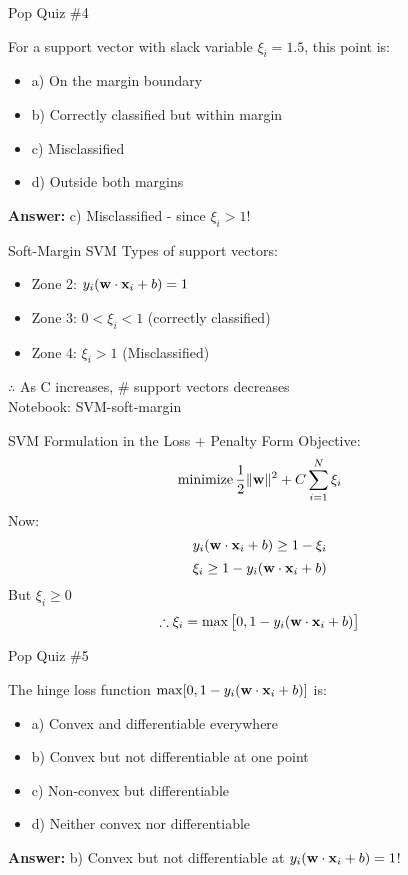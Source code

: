 \documentclass{beamer}
\begin{document}
	\begin{frame}{Pop Quiz \#4}
	\begin{tcolorbox}[colback=blue!5!white,colframe=blue!75!black,title=Quick Question!]
	For a support vector with slack variable $\xi_i = 1.5$, this point is:
	\begin{itemize}
		\item a) On the margin boundary
		\item b) Correctly classified but within margin
		\item c) Misclassified
		\item d) Outside both margins
	\end{itemize}
	\pause
	\textbf{Answer:} c) Misclassified - since $\xi_i > 1$!
	\end{tcolorbox}
	\end{frame}

	\begin{frame}{Soft-Margin SVM}
		Types of support vectors:
		\begin{itemize}
			\item Zone 2: $y_{i}(\mathbf{w} \cdot \mathbf{x}_{i} + b) = 1$
			\item Zone 3: $0 < \xi_{i} < 1$ (correctly classified)
			\item Zone 4: $\xi_{i} > 1$ (Misclassified)
		\end{itemize}
		$\therefore$ As C increases, \# support vectors decreases \\
		\vspace{1cm}
		Notebook: SVM-soft-margin
	\end{frame}
	\begin{frame}{SVM Formulation in the Loss + Penalty Form}
		Objective:
		$$\operatorname{minimize} \frac{1}{2}\|\mathbf{w}\|^{2} + C\sum_{i=1}^{N}\xi_{i}$$
		Now:
		$$y_{i}(\mathbf{w} \cdot \mathbf{x}_{i} + b) \geq 1 - \xi_{i}$$
		$$\xi_{i} \geq 1 - y_{i}(\mathbf{w} \cdot \mathbf{x}_{i} + b)$$
		But $\xi_{i} \geq 0$ \\
		$$\therefore \xi_{i} = \max \big[0, 1 - y_{i}(\mathbf{w} \cdot \mathbf{x}_{i} + b)\big]$$
	\end{frame}
	\begin{frame}{Pop Quiz \#5}
	\begin{tcolorbox}[colback=blue!5!white,colframe=blue!75!black,title=Quick Question!]
	The hinge loss function $\max[0, 1-y_i(\mathbf{w} \cdot \mathbf{x}_i + b)]$ is:
	\begin{itemize}
		\item a) Convex and differentiable everywhere
		\item b) Convex but not differentiable at one point
		\item c) Non-convex but differentiable
		\item d) Neither convex nor differentiable
	\end{itemize}
	\pause
	\textbf{Answer:} b) Convex but not differentiable at $y_i(\mathbf{w} \cdot \mathbf{x}_i + b) = 1$!
	\end{tcolorbox}
	\end{frame}
\end{document}
